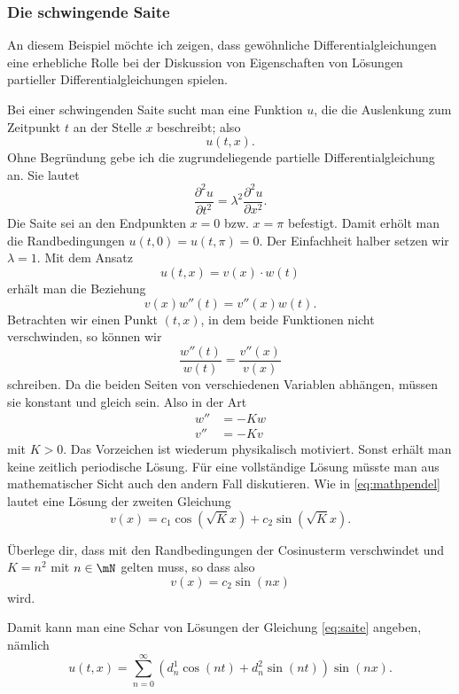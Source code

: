 \documentclass[%
11pt,%
twoside,%
titlepage,%
german,%
headsepline%
]{scrartcl}
\begin{document}
\subsubsection{Die schwingende Saite}

\begin{bem}
An diesem Beispiel m\"ochte ich zeigen, dass gew\"ohnliche Differentialgleichungen eine erhebliche Rolle bei der Diskussion von Eigenschaften von L\"osungen partieller Differentialgleichungen spielen.
\end{bem}

Bei einer schwingenden Saite sucht man eine Funktion $u$, die die Auslenkung zum Zeitpunkt $t$ an der Stelle $x$ beschreibt; also
$$u(t,x).$$
Ohne Begr\"undung gebe ich die zugrundeliegende partielle Differentialgleichung an. Sie lautet
\begin{equation}\label{eq:saite}
\frac{\partial^2u}{\partial t^2}=\lambda^2\frac{\partial^2u}{\partial x^2}.
\end{equation}
Die Saite sei an den Endpunkten $x=0$ bzw. $x=\pi$ befestigt. Damit erh\"olt man die Randbedingungen $u(t,0)=u(t,\pi)=0$. Der Einfachheit halber setzen wir $\lambda=1$.
Mit dem Ansatz
$$u(t,x)=v(x)\cdot w(t)$$
erh\"alt man die Beziehung
$$v(x)w''(t)=v''(x)w(t).$$
Betrachten wir einen Punkt $(t,x)$, in dem beide Funktionen nicht verschwinden, so k\"onnen wir
$$\frac{w''(t)}{w(t)}=\frac{v''(x)}{v(x)}$$
schreiben. Da die beiden Seiten von verschiedenen Variablen abh\"angen, m\"ussen sie konstant und gleich sein. Also in der Art
\begin{align*}
w''&=-Kw\\
v''&=-Kv
\end{align*}
mit $K>0$. Das Vorzeichen ist wiederum physikalisch motiviert. Sonst erh\"alt man keine zeitlich periodische L\"osung. F\"ur eine vollst\"andige L\"osung m\"usste man aus mathematischer Sicht auch den andern Fall diskutieren. Wie in \eqref{eq:mathpendel} lautet eine L\"osung der zweiten Gleichung
$$v(x)=c_1\cos(\sqrt{K}x)+c_2\sin(\sqrt{K}x).$$

\begin{ueb}
\"Uberlege dir, dass mit den Randbedingungen der Cosinusterm verschwindet und $K=n^2$ mit $n\in\mN$ gelten muss, so dass also
$$v(x)=c_2\sin(nx)$$
wird.
\end{ueb}

\noindent Damit kann man eine Schar von L\"osungen der Gleichung \eqref{eq:saite} angeben, n\"amlich
$$u(t,x)=\sum_{n=0}^\infty\left(d_n^1\cos(nt)+d_n^2\sin(nt)\right)\sin(nx).$$
\end{document}
